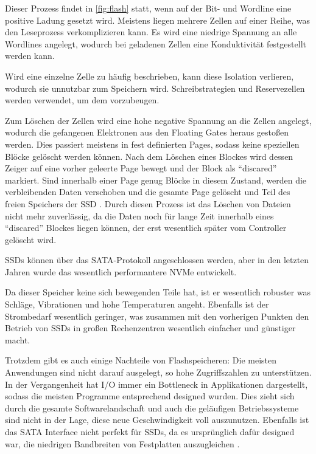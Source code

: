 Dieser Prozess findet in \autoref{fig:flash} statt, wenn auf der Bit- und Wordline eine positive Ladung gesetzt wird. Meistens liegen mehrere Zellen auf einer Reihe, was den Leseprozess verkomplizieren kann. Es wird eine niedrige Spannung an alle Wordlines angelegt, wodurch bei geladenen Zellen eine Konduktivität festgestellt werden kann. 

Wird eine einzelne Zelle zu häufig beschrieben, kann diese Isolation verlieren, wodurch sie unnutzbar zum Speichern wird. Schreibstrategien und Reservezellen werden verwendet, um dem vorzubeugen.	

Zum Löschen der Zellen wird eine hohe negative Spannung an die Zellen angelegt, wodurch die gefangenen Elektronen aus den Floating Gates heraus gestoßen werden. Dies passiert meistens in fest definierten Pages, sodass keine speziellen Blöcke gelöscht werden können. Nach dem Löschen eines Blockes wird dessen Zeiger auf eine vorher geleerte Page bewegt und der Block als ``discared'' markiert. Sind innerhalb einer Page genug Blöcke in diesem Zustand, werden die verbleibenden Daten verschoben und die gesamte Page gelöscht und Teil des freien Speichers der SSD \parencite{kaufmann.2016}. 
Durch diesen Prozess ist das Löschen von Dateien nicht mehr zuverlässig, da die Daten noch für lange Zeit innerhalb eines ``discared'' Blockes liegen können, der erst wesentlich später vom Controller gelöscht wird.

SSDs können über das SATA-Protokoll angeschlossen werden, aber in den letzten Jahren wurde das wesentlich performantere NVMe entwickelt.

Da dieser Speicher keine sich bewegenden Teile hat, ist er wesentlich robuster was Schläge, Vibrationen und hohe Temperaturen angeht. Ebenfalls ist der Strombedarf wesentlich geringer, was zusammen mit den vorherigen Punkten den Betrieb von SSDs in großen Rechenzentren wesentlich einfacher und günstiger macht.

Trotzdem gibt es auch einige Nachteile von Flashspeicheren: Die meisten Anwendungen sind nicht darauf ausgelegt, so hohe Zugriffszahlen zu unterstützen. In der Vergangenheit hat I/O immer ein Bottleneck in Applikationen dargestellt, sodass die meisten Programme entsprechend designed wurden.
Dies zieht sich durch die gesamte Softwarelandschaft und auch die geläufigen Betriebssysteme sind nicht in der Lage, diese neue Geschwindigkeit voll auszunutzen. Ebenfalls ist das SATA Interface nicht perfekt für SSDs, da es ursprünglich dafür designed war, die niedrigen Bandbreiten von Festplatten auszugleichen \parencite[Kap. 3]{kaufmann.2016}.


